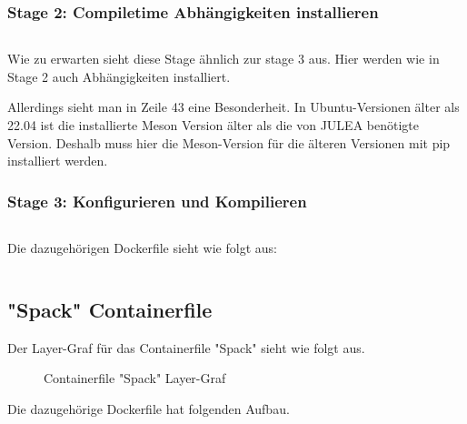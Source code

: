 \subsubsection{Stage 2: Compiletime Abhängigkeiten installieren}

\inputminted[firstline=28,lastline=43]{dockerfile}{./code-examples/Dockerfile.system}

Wie zu erwarten sieht diese Stage ähnlich zur stage 3 aus. Hier werden wie in Stage 2 auch Abhängigkeiten installiert. 

Allerdings sieht man in Zeile 43 eine Besonderheit. In Ubuntu-Versionen älter als 22.04 ist die installierte Meson Version älter als die von JULEA benötigte Version. Deshalb muss hier die Meson-Version für die älteren Versionen mit pip installiert werden. 

\subsubsection{Stage 3: Konfigurieren und Kompilieren}

\inputminted[firstline=46,lastline=53]{dockerfile}{./code-examples/Dockerfile.system}



Die dazugehörigen Dockerfile sieht wie folgt aus: 

\inputminted{dockerfile}{./code-examples/Dockerfile.system}

\subsection{"Spack" Containerfile}
Der Layer-Graf für das Containerfile "Spack" sieht wie folgt aus.
\begin{figure}[!htbp]
    \centering
    
    \caption{Containerfile "Spack" Layer-Graf}
\end{figure}

Die dazugehörige Dockerfile hat folgenden Aufbau.

\inputminted{dockerfile}{./code-examples/Dockerfile.spack}

